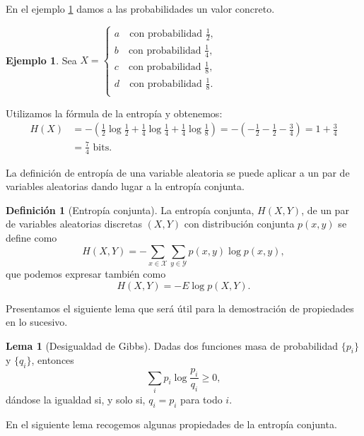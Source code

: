 \documentclass[10pt,a4paper]{article} %
\theoremstyle{definition}
\newtheorem{definition}{Definición}[section]
\newtheorem{lemma}[theorem]{Lema}
\newtheorem{example}[theorem]{Ejemplo}
\begin{document}
En el ejemplo \ref{e:entr} damos a las probabilidades un valor concreto.
\begin{example}\label{e:entr}
  Sea $X = 
     \begin{cases}
       a \quad\text{con probabilidad } \frac{1}{2},\\
       b \quad\text{con probabilidad } \frac{1}{4}, \\
       c \quad\text{con probabilidad } \frac{1}{8}, \\
       d \quad\text{con probabilidad } \frac{1}{8}. \\
     \end{cases}$ 

     Utilizamos la fórmula de la entropía y obtenemos: \begin{align*}
       H(X) &= - \left (\frac{1}{2} \log \frac{1}{2} + \frac{1}{4} \log \frac{1}{4} + \frac{1}{4} \log \frac{1}{8} \right ) = - \left (-\frac{1}{2} - \frac{1}{2} - \frac{3}{4} \right ) = 1 + \frac{3}{4}\\
       &= \frac{7}{4} \text{ bits}.\end{align*}
\end{example}

La definición de entropía de una variable aleatoria se puede aplicar a un par de variables aleatorias dando lugar a la entropía conjunta.

\begin{definition}[Entropía conjunta]
  La entropía conjunta, $H(X,Y)$, de un par de variables aleatorias discretas $(X,Y)$ con distribución conjunta $p(x,y)$ se define como \[
  H(X,Y) = - \sum_{x \in \mathcal{X}} \sum_{y \in \mathcal{Y}} p(x,y) \log p(x,y), \]
  que podemos expresar también como \[
  H(X,Y) = - E \log p(X,Y).\]
\end{definition}
Presentamos el siguiente lema que será útil para la demostración de propiedades en lo sucesivo.

\begin{lemma}[Desigualdad de Gibbs]\label{l:gibbs}
  Dadas dos funciones masa de probabilidad $\{p_i\}$ y $\{q_i\}$, entonces \[
\sum_i p_i \log \frac{p_i}{q_i} \ge 0,
\]
dándose la igualdad si, y solo si, $q_i = p_i$ para todo $i$.
\end{lemma}


En el siguiente lema recogemos algunas propiedades de la entropía conjunta.
\end{document}
